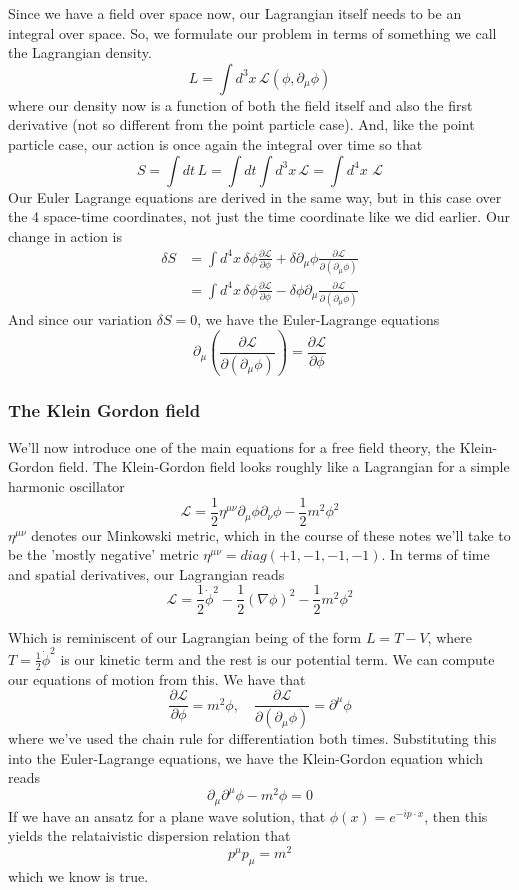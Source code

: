 Since we have a field over space now, our Lagrangian itself needs to be an integral over space. So, we formulate our problem in terms of something we call the Lagrangian density. \[ L = \int d^3 x \, \mathcal{L} ( \phi, \partial_\mu \phi ) \] 
where our density now is a function of both the field itself and also the first derivative (not so different from the point particle case). And, like the point particle case, our action is once again the integral over time so that \[ S = \int dt \, L  = \int dt \int d^3 x \, \mathcal{L } = \int d^4 x \, \, \mathcal{ L } \] 
Our Euler Lagrange equations are derived in the same way, but in this case over the 4 space-time coordinates, not just the time coordinate like we did earlier. Our change in action is 
\begin{align*} 
\delta S &= \int d^4 x \, \delta \phi \frac{ \partial \mathcal{ L} }{ \partial \phi } + \delta \partial_\mu \phi \frac{ \partial \mathcal{ L }}{ \partial ( \partial_\mu \phi ) } \\ 
&= \int d^4 x \, \delta \phi \frac{ \partial \mathcal{L } } { \partial \phi }   - \delta\phi  \partial_\mu \frac{\partial \mathcal{ L  }}{ \partial ( \partial_\mu \phi ) }
\end{align*} 
And since our variation $\delta S = 0$, we have the Euler-Lagrange equations 
\[ \partial_\mu  \left( \frac{ \partial \mathcal{ L } }{ \partial (\partial_\mu \phi) } \right)  = \frac{ \partial \mathcal{ L } }{ \partial \phi }  \] 

\subsubsection{The Klein Gordon field} 
We'll now introduce one of the main equations for a free field theory, the Klein-Gordon field. The Klein-Gordon field looks roughly like a Lagrangian for a simple harmonic oscillator
\[ 
\mathcal{L}  = \frac{1}{2} \eta^{ \mu \nu} \partial_\mu \phi \partial_\nu \phi  - \frac{1}{2} m^2 \phi^2 
\] 
$\eta^{\mu \nu}$ denotes our Minkowski metric, which in the course of these notes we'll take to be the 'mostly negative' metric $\eta^{\mu \nu}  = diag ( +1, -1, -1, -1)$. In terms of time and spatial derivatives, our Lagrangian reads 
\[ 
\mathcal{ L }  = \frac{1}{2} \dot{ \phi}^2  - \frac{1}{2} ( \nabla \phi)^2  - \frac{1}{ 2} m^2 \phi^2 
\]

Which is reminiscent of our Lagrangian being of the form $L = T - V$, where $T = \frac{1}{ 2} \dot{ \phi}^2 $ is our kinetic term and the rest is our potential term. We can compute our equations of motion from this. We have that 
\[ 
\frac{ \partial \mathcal{L} }{ \partial \phi} = m^2  \phi, \quad \frac{ \partial \mathcal{ L }}{ \partial ( \partial_\mu \phi ) }  = \partial^\mu \phi 
\] 
where we've used the chain rule for differentiation both times. Substituting this into the Euler-Lagrange equations, we have the Klein-Gordon equation which reads 
\[
\partial_\mu \partial^\mu \phi  - m^2 \phi  = 0 
\]
If we have an ansatz for a plane wave solution, that $\phi(x)  = e^{ - i p \cdot x}$, then this yields the relataivistic dispersion relation that 
\[
p^\mu p_\mu = m^2 
\] 
which we know is true.

